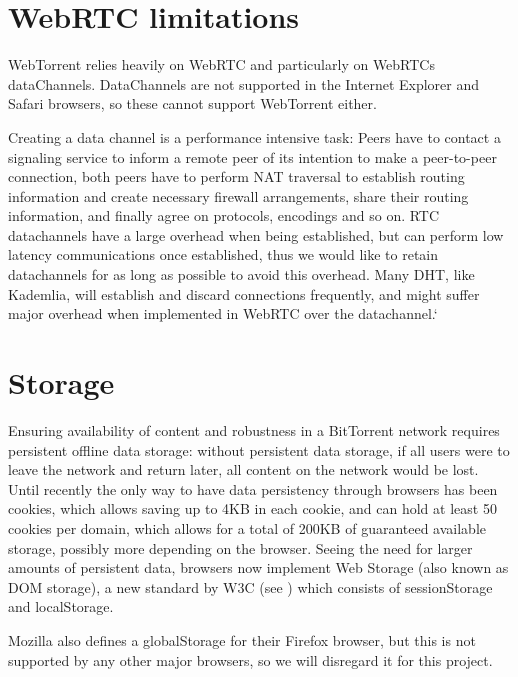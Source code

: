 \section{WebRTC limitations}
WebTorrent relies heavily on WebRTC and particularly on WebRTCs dataChannels.
DataChannels are not supported in the Internet Explorer and Safari browsers, 
so these cannot support WebTorrent either.

Creating a data channel is a performance intensive task:
Peers have to contact a signaling service to inform a remote peer of its intention
to make a peer-to-peer connection, both peers have to perform NAT traversal to establish routing information 
and create necessary firewall arrangements, share their routing information,
and finally agree on protocols, encodings and so on.
RTC datachannels have a large overhead when being established,
but can perform low latency communications once established, 
thus we would like to retain datachannels for as long as possible to avoid this overhead.
Many \acs{DHT}, like Kademlia, will establish and discard connections frequently,
and might suffer major overhead when implemented in WebRTC over the datachannel.`

\section{Storage}
Ensuring availability of content and robustness in a BitTorrent network requires persistent offline data storage:
without persistent data storage, if all users were to leave the network and return later, all content on the 
network would be lost.
\newline\newline
Until recently the only way to have data persistency through browsers has been cookies, 
which allows saving up to 4KB in each cookie, and can hold at least 50 cookies per domain, 
which allows for a total of 200KB of guaranteed available storage, possibly more depending on the browser.
\newline\newline
Seeing the need for larger amounts of persistent data, browsers now implement Web Storage 
(also known as DOM storage), a new standard by W3C (see \citep{WebStorage})
which consists of sessionStorage and localStorage.

Mozilla also defines a globalStorage for their Firefox browser, 
but this is not supported by any other major browsers, so we will disregard it for this project.

